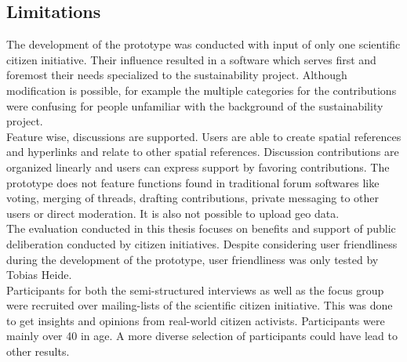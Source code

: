 \subsection{Limitations}
\label{sub:limitations}
The development of the prototype was conducted with input of only one scientific citizen initiative. Their influence resulted in a software which serves first and foremost their needs specialized to the sustainability project. Although modification is possible, for example the multiple categories for the contributions were confusing for people unfamiliar with the background of the sustainability project.\\
Feature wise, discussions are supported. Users are able to create spatial references and hyperlinks and relate to other spatial references. Discussion contributions are organized linearly and users can express support by favoring contributions. The prototype does not feature functions found in traditional forum softwares like voting, merging of threads, drafting contributions, private messaging to other users or direct moderation. It is also not possible to upload geo data. \\
The evaluation conducted in this thesis focuses on benefits and support of public deliberation conducted by citizen initiatives. Despite considering user friendliness during the development of the prototype, user friendliness was only tested by Tobias Heide.\\
Participants for both the semi-structured interviews as well as the focus group were recruited over mailing-lists of the scientific citizen initiative. This was done to get insights and opinions from real-world citizen activists. Participants were mainly over 40 in age. A more diverse selection of participants could have lead to other results.


